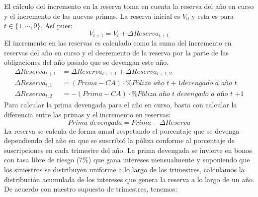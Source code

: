 \documentclass{article}
\begin{document}
El cálculo del incremento en la reserva toma en cuenta la reserva del año en curso y el incremento de las nuevas primas. La reserva inicial es $V_0$ y esta es para $t \in \{1, \cdots, 9\}$. Así pues:
\begin{equation*}
    V_{t+1} = V_t + \Delta \textit{Reserva}_{t+1}
\end{equation*}
El incremento en las reservas es calculado como la suma del incremento en reservas del año en curso y el decremento de la reserva por la parte de las obligaciones del año pasado que se devengan este año.
\begin{align*}
    \Delta \textit{Reserva}_{t+1} &= \Delta \textit{Reserva}_{t+1,1 } + 
    \Delta \textit{Reserva}_{t+1, 2} \\
    \Delta \textit{Reserva}_{t,1} &= (\textit{Prima} - CA) \cdot
    \% \textit{Póliza año  } t+1 \textit{devengado a año t} \\
      \Delta \textit{Reserva}_{t,2} &= - (\textit{Prima} - CA) \cdot
    \% \textit{Póliza año  } t \textit{  devengado a año t +1}
\end{align*}
Para calcular la prima devengada para el año en curso, basta con calcular la diferencia entre las primas y el incremento en reservas:
\begin{equation*}
    \textit{Prima devengada} = \textit{Prima} - \Delta \textit{Reserva}
\end{equation*}
La reserva se calcula de forma anual respetando el porcentaje que se devenga dependiendo del año en que se suscribió la póliza conforme al porcentaje de suscripciones en cada trimestre del año.
La prima devengada se invierte en bonos con tasa libre de riesgo (7$\%$) que gana intereses mensualmente y suponiendo que los siniestros se distribuyen uniforme a lo largo de los trimestres, calculamos la distribución acumulada de los intereses que genera la reserva a lo largo de un año. De acuerdo con nuestro supuesto de trimestres, tenemos:
\end{document}
